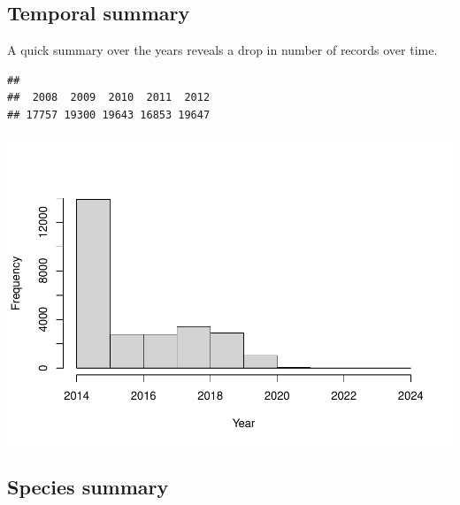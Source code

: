 \documentclass[
  10pt,
]{article}
\newenvironment{Shaded}{\begin{snugshade}}{\end{snugshade}}
\newcommand{\AttributeTok}[1]{\textcolor[rgb]{0.77,0.63,0.00}{#1}}
\newcommand{\FunctionTok}[1]{\textcolor[rgb]{0.00,0.00,0.00}{#1}}
\newcommand{\NormalTok}[1]{#1}
\newcommand{\SpecialCharTok}[1]{\textcolor[rgb]{0.00,0.00,0.00}{#1}}
\newcommand{\StringTok}[1]{\textcolor[rgb]{0.31,0.60,0.02}{#1}}
\begin{document}
\hypertarget{temporal-summary}{%
\subsection{Temporal summary}\label{temporal-summary}}

A quick summary over the years reveals a drop in number of records over time.

\begin{Shaded}
\end{Shaded}

\begin{verbatim}
## 
##  2008  2009  2010  2011  2012 
## 17757 19300 19643 16853 19647
\end{verbatim}

\begin{Shaded}
\end{Shaded}

\includegraphics{r-tools-tutorial_files/figure-latex/timeHist-1.pdf}

\hypertarget{species-summary}{%
\subsection{Species summary}\label{species-summary}}
\end{document}

